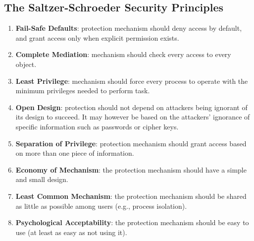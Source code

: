 \subsection{The Saltzer-Schroeder Security Principles}
\begin{enumerate}
    \item \textbf{Fail-Safe Defaults}: protection mechanism should deny access by default, and grant access only when explicit permission exists.
    \item \textbf{Complete Mediation}: mechanism should check every access to every object.
    \item \textbf{Least Privilege}: mechanism should force every process to operate with the minimum privileges needed to perform task.
    \item \textbf{Open Design}: protection should not depend on attackers being ignorant of its design to succeed. It may however be based on the attackers’ ignorance of specific information such as passwords or cipher keys.
    \item \textbf{Separation of Privilege}: protection mechanism should grant access based on more than one piece of information.
    \item \textbf{Economy of Mechanism}: the protection mechanism should have a simple and small design.
    \item \textbf{Least Common Mechanism}: the protection mechanism should be shared as little as possible among users (e.g., process isolation).
    \item \textbf{Psychological Acceptability}: the protection mechanism should be easy to use (at least as easy as not using it).
\end{enumerate}